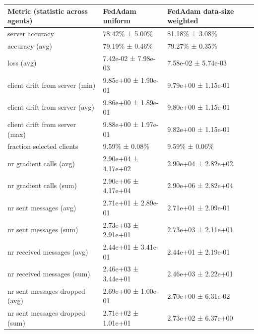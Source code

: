 \begin{tabular}{lll}
\hline
 Metric (statistic across agents)   & FedAdam uniform     & FedAdam data-size weighted   \\
\hline
 server accuracy                    & 78.42\% ± 5.00\%      & 81.18\% ± 3.08\%               \\
 accuracy (avg)                     & 79.19\% ± 0.46\%      & 79.27\% ± 0.35\%               \\
 loss (avg)                         & 7.42e-02 ± 7.98e-03 & 7.58e-02 ± 5.74e-03          \\
 client drift from server (min)     & 9.85e+00 ± 1.90e-01 & 9.79e+00 ± 1.15e-01          \\
 client drift from server (avg)     & 9.86e+00 ± 1.89e-01 & 9.80e+00 ± 1.15e-01          \\
 client drift from server (max)     & 9.88e+00 ± 1.97e-01 & 9.82e+00 ± 1.15e-01          \\
 fraction selected clients          & 9.59\% ± 0.08\%       & 9.59\% ± 0.06\%                \\
 nr gradient calls (avg)            & 2.90e+04 ± 4.17e+02 & 2.90e+04 ± 2.82e+02          \\
 nr gradient calls (sum)            & 2.90e+06 ± 4.17e+04 & 2.90e+06 ± 2.82e+04          \\
 nr sent messages (avg)             & 2.71e+01 ± 2.89e-01 & 2.71e+01 ± 2.09e-01          \\
 nr sent messages (sum)             & 2.73e+03 ± 2.91e+01 & 2.73e+03 ± 2.11e+01          \\
 nr received messages (avg)         & 2.44e+01 ± 3.41e-01 & 2.44e+01 ± 2.19e-01          \\
 nr received messages (sum)         & 2.46e+03 ± 3.44e+01 & 2.46e+03 ± 2.22e+01          \\
 nr sent messages dropped (avg)     & 2.69e+00 ± 1.00e-01 & 2.70e+00 ± 6.31e-02          \\
 nr sent messages dropped (sum)     & 2.71e+02 ± 1.01e+01 & 2.73e+02 ± 6.37e+00          \\
\hline
\end{tabular}
